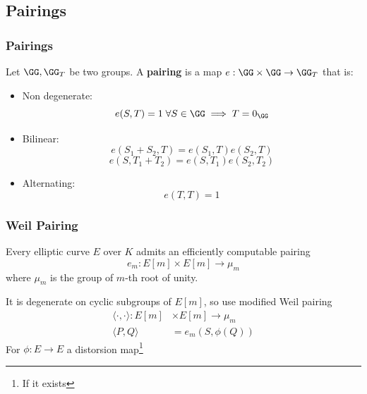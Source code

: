 \documentclass{beamer}
\begin{document}
\subsection{Pairings}
\begin{frame}
    \frametitle{Pairings}
    \begin{definition}
        Let $\GG, \GG_T$ be two groups. A \textbf{pairing} is a map $e: \GG \times \GG \to \GG_T$ that is:
        
        \begin{itemize}
            \item Non degenerate: 
            \[ e(S, T) = 1 \; \forall S \in \GG \implies T = 0_{\GG}  \]
            \item Bilinear:
            \[ e(S_1 + S_2, T) = e(S_1, T)e(S_2, T)\]
            \[ e(S, T_1 + T_2) = e(S, T_1)e(S_2, T_2)\]
            \item Alternating:
            \[ e(T, T) = 1 \]
            
        \end{itemize}
    \end{definition}
\end{frame}

\begin{frame}
    \frametitle{Weil Pairing}
    Every elliptic curve $E$ over $K$ admits an efficiently computable pairing
    \[ e_m : E[m] \times E[m] \to \mu_m \]
    where $\mu_m$ is the group of $m$-th root of unity. 

    
    It is degenerate on cyclic subgroups of $E[m]$, so use modified Weil pairing
    \begin{align*}
        \langle \cdot , \cdot \rangle : E[m] &\times E[m] \to \mu_m \\
        \langle P, Q \rangle &= e_m(S, \phi(Q))
    \end{align*}
    For $\phi: E \to E$ a distorsion map\footnote{If it exists}

\end{frame}
\end{document}
